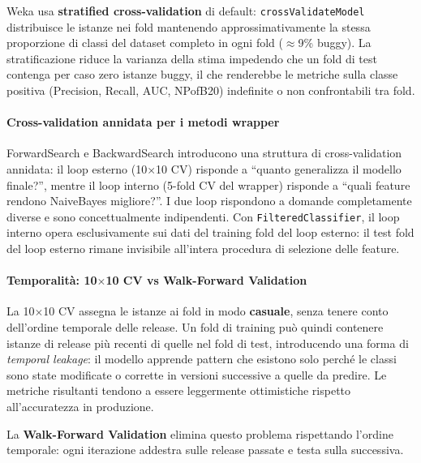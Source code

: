 Weka usa \textbf{stratified cross-validation} di default: \texttt{crossValidateModel}
distribuisce le istanze nei fold mantenendo approssimativamente la stessa proporzione
di classi del dataset completo in ogni fold ($\approx$9\% buggy). La stratificazione
riduce la varianza della stima impedendo che un fold di test contenga per caso zero
istanze buggy, il che renderebbe le metriche sulla classe positiva (Precision, Recall,
AUC, NPofB20) indefinite o non confrontabili tra fold.

\paragraph{Cross-validation annidata per i metodi wrapper}
\label{sec:nested-cv}

ForwardSearch e BackwardSearch introducono una struttura di cross-validation annidata: il
loop esterno (10$\times$10 CV) risponde a ``quanto generalizza il modello finale?'',
mentre il loop interno (5-fold CV del wrapper) risponde a ``quali feature rendono
NaiveBayes migliore?''. I due loop rispondono a domande completamente diverse e sono
concettualmente indipendenti. Con \texttt{FilteredClassifier}, il loop interno opera
esclusivamente sui dati del training fold del loop esterno: il test fold del loop esterno
rimane invisibile all'intera procedura di selezione delle feature.

\paragraph{Temporalità: 10$\times$10 CV vs Walk-Forward Validation}
\label{sec:temporal}

La 10$\times$10 CV assegna le istanze ai fold in modo \textbf{casuale}, senza tenere
conto dell'ordine temporale delle release. Un fold di training può quindi contenere
istanze di release più recenti di quelle nel fold di test, introducendo una forma di
\textit{temporal leakage}: il modello apprende pattern che esistono solo perché le classi
sono state modificate o corrette in versioni successive a quelle da predire. Le metriche
risultanti tendono a essere leggermente ottimistiche rispetto all'accuratezza in produzione.

La \textbf{Walk-Forward Validation} elimina questo problema rispettando l'ordine
temporale: ogni iterazione addestra sulle release passate e testa sulla successiva.

